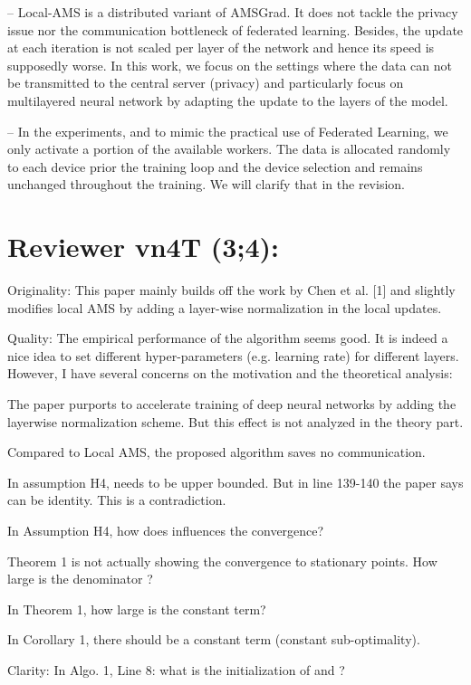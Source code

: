\documentclass{article}
\begin{document}
-- Local-AMS is a distributed variant of AMSGrad. It does not tackle the privacy issue nor the communication bottleneck of federated learning. Besides, the update at each iteration is not scaled per layer of the network and hence its speed is supposedly worse.
In this work, we focus on the settings where the data can not be transmitted to the central server (privacy) and particularly focus on multilayered neural network by adapting the update to the layers of the model.

-- In the experiments, and to mimic the practical use of Federated Learning, we only activate a portion of the available workers. The data is allocated randomly to each device prior the training loop and the device selection and remains unchanged throughout the training. We will clarify that in the revision.

\section{Reviewer vn4T (3;4):}

Originality:
This paper mainly builds off the work by Chen et al. [1] and slightly modifies local AMS by adding a layer-wise normalization in the local updates.

Quality:
The empirical performance of the algorithm seems good. It is indeed a nice idea to set different hyper-parameters (e.g. learning rate) for different layers. However, I have several concerns on the motivation and the theoretical analysis:

The paper purports to accelerate training of deep neural networks by adding the layerwise normalization scheme. But this effect is not analyzed in the theory part.

Compared to Local AMS, the proposed algorithm saves no communication.

In assumption H4,  needs to be upper bounded. But in line 139-140 the paper says  can be identity. This is a contradiction.

In Assumption H4, how does 
 influences the convergence?

Theorem 1 is not actually showing the convergence to stationary points. How large is the denominator 
?

In Theorem 1, how large is the constant term?

In Corollary 1, there should be a constant term (constant sub-optimality).

Clarity:
In Algo. 1, Line 8: what is the initialization of  and ?
\end{document}
